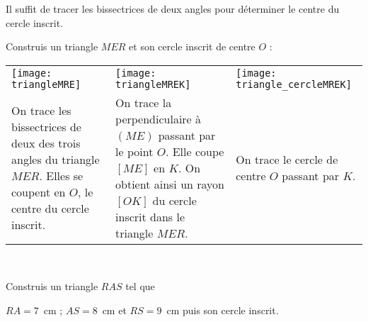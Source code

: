  \begin{methode*1}
 
 \begin{remarque}
Il suffit de tracer les bissectrices de deux angles pour déterminer le centre du cercle inscrit.
 \end{remarque}
 
 \begin{exemple*1}
 Construis un triangle $MER$ et son cercle inscrit de centre $O$ :
 \begin{tabularx}{\textwidth}{X|X|X}
 \texttt{[image: triangleMRE]} &  \texttt{[image: triangleMREK]} & \texttt{[image: triangle\_cercleMREK]} \\ 
 On trace les bissectrices de deux des trois angles du triangle $MER$. Elles se coupent en $O$, le centre du cercle inscrit. & On trace la perpendiculaire à $(ME)$ passant par le point $O$. Elle coupe $[ME]$ en $K$. On obtient ainsi un rayon $[OK]$ du cercle inscrit dans le triangle $MER$. & On trace le cercle de centre $O$ passant par $K$. \\
 \end{tabularx} \\

\end{exemple*1}
 
 \exercice
Construis un triangle $RAS$ tel que 

$RA = 7$ cm ; $AS = 8$ cm et $RS = 9$ cm puis son cercle inscrit.
 
 \end{methode*1}

